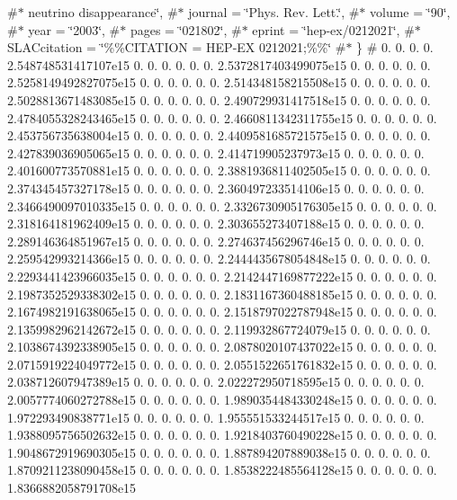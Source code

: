 \#$\ast$                  neutrino disappearance\char`\"{}, \#$\ast$ journal = \char`\"{}\+Phys. Rev. Lett.\char`\"{}, \#$\ast$ volume = \char`\"{}90\char`\"{}, \#$\ast$ year = \char`\"{}2003\char`\"{}, \#$\ast$ pages = \char`\"{}021802\char`\"{}, \#$\ast$ eprint = \char`\"{}hep-\/ex/0212021\char`\"{}, \#$\ast$ S\+L\+A\+Ccitation = \char`\"{}\%\%\+C\+I\+T\+A\+T\+I\+O\+N = H\+E\+P-\/\+E\+X 0212021;\%\%\char`\"{} \#$\ast$ \} \# 0. 0. 0. 0. 2.\+548748531417107e15 0. 0. 0. 0. 0. 0. 2.\+5372817403499075e15 0. 0. 0. 0. 0. 0. 2.\+5258149492827075e15 0. 0. 0. 0. 0. 0. 2.\+514348158215508e15 0. 0. 0. 0. 0. 0. 2.\+5028813671483085e15 0. 0. 0. 0. 0. 0. 2.\+490729931417518e15 0. 0. 0. 0. 0. 0. 2.\+4784055328243465e15 0. 0. 0. 0. 0. 0. 2.\+4660811342311755e15 0. 0. 0. 0. 0. 0. 2.\+453756735638004e15 0. 0. 0. 0. 0. 0. 2.\+4409581685721575e15 0. 0. 0. 0. 0. 0. 2.\+427839036905065e15 0. 0. 0. 0. 0. 0. 2.\+414719905237973e15 0. 0. 0. 0. 0. 0. 2.\+401600773570881e15 0. 0. 0. 0. 0. 0. 2.\+3881936811402505e15 0. 0. 0. 0. 0. 0. 2.\+374345457327178e15 0. 0. 0. 0. 0. 0. 2.\+360497233514106e15 0. 0. 0. 0. 0. 0. 2.\+3466490097010335e15 0. 0. 0. 0. 0. 0. 2.\+3326730905176305e15 0. 0. 0. 0. 0. 0. 2.\+318164181962409e15 0. 0. 0. 0. 0. 0. 2.\+303655273407188e15 0. 0. 0. 0. 0. 0. 2.\+289146364851967e15 0. 0. 0. 0. 0. 0. 2.\+274637456296746e15 0. 0. 0. 0. 0. 0. 2.\+259542993214366e15 0. 0. 0. 0. 0. 0. 2.\+2444435678054848e15 0. 0. 0. 0. 0. 0. 2.\+2293441423966035e15 0. 0. 0. 0. 0. 0. 2.\+2142447169877222e15 0. 0. 0. 0. 0. 0. 2.\+1987352529338302e15 0. 0. 0. 0. 0. 0. 2.\+1831167360488185e15 0. 0. 0. 0. 0. 0. 2.\+1674982191638065e15 0. 0. 0. 0. 0. 0. 2.\+1518797022787948e15 0. 0. 0. 0. 0. 0. 2.\+1359982962142672e15 0. 0. 0. 0. 0. 0. 2.\+119932867724079e15 0. 0. 0. 0. 0. 0. 2.\+1038674392338905e15 0. 0. 0. 0. 0. 0. 2.\+0878020107437022e15 0. 0. 0. 0. 0. 0. 2.\+0715919224049772e15 0. 0. 0. 0. 0. 0. 2.\+0551522651761832e15 0. 0. 0. 0. 0. 0. 2.\+038712607947389e15 0. 0. 0. 0. 0. 0. 2.\+022272950718595e15 0. 0. 0. 0. 0. 0. 2.\+0057774060272788e15 0. 0. 0. 0. 0. 0. 1.\+9890354484330248e15 0. 0. 0. 0. 0. 0. 1.\+972293490838771e15 0. 0. 0. 0. 0. 0. 1.\+955551533244517e15 0. 0. 0. 0. 0. 0. 1.\+9388095756502632e15 0. 0. 0. 0. 0. 0. 1.\+9218403760490228e15 0. 0. 0. 0. 0. 0. 1.\+9048672919690305e15 0. 0. 0. 0. 0. 0. 1.\+887894207889038e15 0. 0. 0. 0. 0. 0. 1.\+8709211238090458e15 0. 0. 0. 0. 0. 0. 1.\+8538222485564128e15 0. 0. 0. 0. 0. 0. 1.\+8366882058791708e15 
